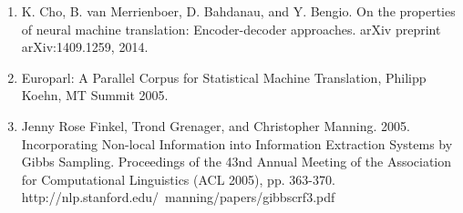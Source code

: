 \documentclass[letterpaper, 11pt]{article}
\begin{document}
\begin{multicols}{2}
\begin{enumerate}
\item K. Cho, B. van Merrienboer, D. Bahdanau, and Y. Bengio. On the properties of neural machine translation: Encoder-decoder approaches. arXiv preprint arXiv:1409.1259, 2014.

\item Europarl: A Parallel Corpus for Statistical Machine Translation, Philipp Koehn, MT Summit 2005.

\item Jenny Rose Finkel, Trond Grenager, and Christopher Manning. 2005. Incorporating Non-local Information into Information Extraction Systems by Gibbs Sampling. Proceedings of the 43nd Annual Meeting of the Association for Computational Linguistics (ACL 2005), pp. 363-370. http://nlp.stanford.edu/~manning/papers/gibbscrf3.pdf
\end{enumerate}

\end{multicols}
\end{document}
